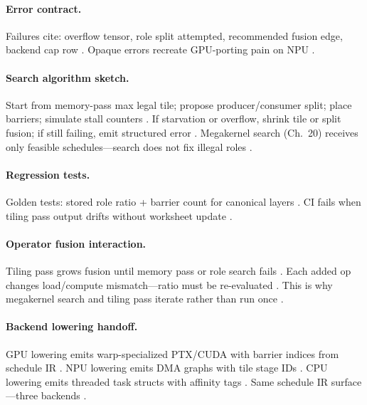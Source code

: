 \paragraph{Error contract.}
Failures cite: overflow tensor, role split attempted, recommended fusion edge, backend cap row \citep{yirage2026,patel2025llminference}.
Opaque errors recreate GPU-porting pain on NPU \citep{amd2024xdna,chen2020compilerbasedhardw}.

\paragraph{Search algorithm sketch.}
Start from memory-pass max legal tile; propose producer/consumer split; place barriers; simulate stall counters \citep{wu2024mirage,yirage2026,shah2024flashattention3}.
If starvation or overflow, shrink tile or split fusion; if still failing, emit structured error \citep{mpk2025,chen2020compilerbasedhardw}.
Megakernel search (Ch.~20) receives only feasible schedules---search does not fix illegal roles \citep{wu2024mirage,mpk2025}.

\paragraph{Regression tests.}
Golden tests: stored role ratio + barrier count for canonical layers \citep{yirage2026,wu2024mirage}.
CI fails when tiling pass output drifts without worksheet update \citep{chen2020compilerbasedhardw,taxbreak2026}.

\paragraph{Operator fusion interaction.}
Tiling pass grows fusion until memory pass or role search fails \citep{wu2024mirage,yirage2026,shah2024flashattention3}.
Each added op changes load/compute mismatch---ratio must be re-evaluated \citep{patel2025llminference,memoryfloor2026,taxbreak2026}.
This is why megakernel search and tiling pass iterate rather than run once \citep{mpk2025,chen2020compilerbasedhardw}.

\paragraph{Backend lowering handoff.}
GPU lowering emits warp-specialized PTX/CUDA with barrier indices from schedule IR \citep{shah2024flashattention3,nvidia2022hopper,yirage2026}.
NPU lowering emits DMA graphs with tile stage IDs \citep{amd2024xdna,amd2024aie,patel2025llminference}.
CPU lowering emits threaded task structs with affinity tags \citep{dlbook,chen2020compilerbasedhardw,kwon2023vllm}.
Same schedule IR surface---three backends \citep{yirage2026,chen2020compilerbasedhardw}.

